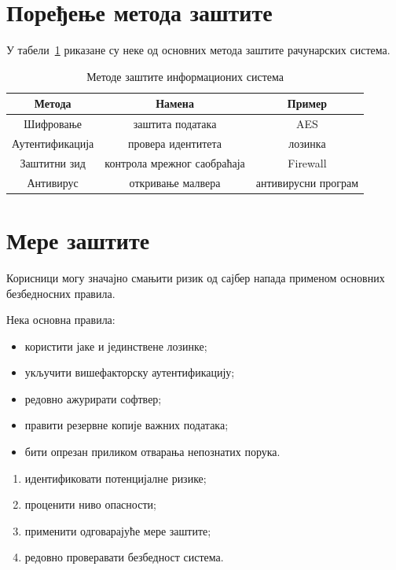 \documentclass[12pt,a4paper]{article}
\begin{document}
\section{Поређење метода заштите}

У табели~\ref{tab:metode} риказане су неке од основних метода заштите рачунарских система.

\begin{table}[ht]
\centering

\label{tab:metode}
\begin{tabular}{|c|c|c|}
\hline
\textbf{Метода} & \textbf{Намена} & \textbf{Пример} \\
\hline
Шифровање & заштита података & AES \\
\hline
Аутентификација & провера идентитета & лозинка  \\
\hline
Заштитни зид & контрола мрежног саобраћаја & Firewall \\
\hline
Антивирус & откривање малвера & антивирусни програм \\
\hline
\end{tabular}
\caption{Методе заштите информационих система}
\end{table}

\section{Мере заштите}

Корисници могу значајно смањити ризик од сајбер напада применом основних безбедносних правила.

Нека основна правила:

\begin{itemize}
    \item користити јаке и јединствене лозинке;
    \item укључити вишефакторску аутентификацију;
    \item редовно ажурирати софтвер;
    \item правити резервне копије важних података;
    \item бити опрезан приликом отварања непознатих порука.
\end{itemize}
\begin{enumerate}
    \item идентификовати потенцијалне ризике;
    \item проценити ниво опасности;
    \item применити одговарајуће мере заштите;
    \item редовно проверавати безбедност система.
\end{enumerate}
    
\end{document}
